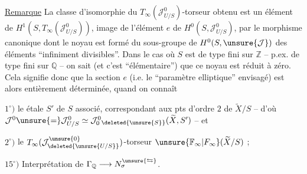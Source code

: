 \uline{Remarque} La classe d'isomorphie du $T_\infty(\mathcal J^0_{U/S})$-torseur obtenu est un élément de $H^1(S,T_\infty(\mathcal J^0_{U/S}))$, image de l'élément $e$ de $H^0(S,\mathcal J^0_{U/S})$, par le morphisme canonique
dont le noyau est formé du sous-groupe de $H^0(S,\unsure{\mathcal J})$ des éléments ``infiniment divisibles''. Dans le cas où $S$ est  de type fini sur $\mathbb Z$ -- p.ex.  de type fini sur $\mathbb Q$ -- on sait (et c'est  ``élémentaire'') que ce noyau est réduit à zéro. Cela signifie donc que la section $e$  (i.e. le ``paramètre elliptique'' envisagé) est alors entièrement déterminée, quand on connaît

$1^{\circ})$ le   étale $S'$ de $S$ associé, correspondant aux pts d'ordre $2$ de $\widetilde X/S$ -- d'où $\mathcal J^0\unsure{=}\mathcal J^0_{U/S}\simeq\mathcal J^0_0{}_{\deleted{\unsure{S}}}(\widetilde X,S')$ -- et

$2^{\circ})$ le $T_\infty(\mathcal J^{\unsure{0}}_{\deleted{\unsure{U/S}}})$-torseur $\unsure{\mathbb F_\infty|F_\infty}(\widetilde X/S)$ ;

$15^{\circ})$ Interprétation de $\Gamma_{\mathbb Q}\longrightarrow N_\sigma^{\unsure{\leftrightarrows}}$.

